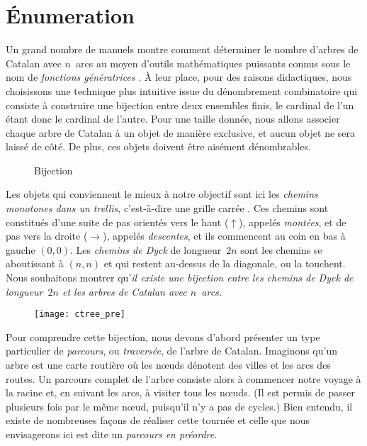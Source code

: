 \section{Énumeration}
\label{sec:Catalan_enumeration}

Un grand nombre de manuels \cite[\S~5.1
\&~5.2]{SedgewickFlajolet_1996} montre comment déterminer le nombre
d'arbres de Catalan avec \(n\)~arcs au moyen d'outils mathématiques
puissants connus sous le nom de \emph{fonctions génératrices}
\cite[chap.~7]{GrahamKnuthPatashnik_1994}. À leur place, pour des
raisons didactiques, nous choisissons une technique plus intuitive
issue du dénombrement combinatoire
qui consiste à construire une bijection entre deux ensembles finis, le
cardinal de l'un étant donc le cardinal de l'autre. Pour une taille
donnée, nous allons associer chaque arbre de Catalan à un objet de
manière exclusive, et aucun objet ne sera laissé de côté. De plus, ces
objets doivent être aisément dénombrables.

%
\begin{wrapfigure}[11]{r}[0pt]{0pt}
\centering
{}
\quad
{}
\caption{Bijection}
\label{fig:bijection}
\end{wrapfigure}
Les objets qui conviennent le mieux à notre objectif sont ici les
\emph{chemins monotones dans un trellis},  c'est-à-dire une grille carrée
\citep{Mohanty_1979,Humphreys_2010}. Ces chemins sont constitués d'une
suite de pas orientés vers le haut (\(\uparrow\)), appelés
\emph{montées}, et de pas vers la droite (\(\rightarrow\)), appelés
\emph{descentes}, et ils commencent au coin en bas à gauche
\((0,0)\). Les \emph{chemins de Dyck} de
longueur~\(2n\) sont les chemins se aboutissant à \((n,n)\) et qui
restent au-dessus de la diagonale, ou la touchent. Nous souhaitons
montrer qu'\emph{il existe une bijection entre les chemins de Dyck de
  longueur~\(2n\) et les arbres de Catalan avec \(n\)~arcs.}

\begin{wrapfigure}[7]{r}[0pt]{0pt}
\centering
\texttt{[image: ctree\_pre]}
\caption{}
\label{fig:ctree_pre}
\end{wrapfigure}
Pour comprendre cette bijection, nous devons d'abord présenter un type
particulier de \emph{parcours}, ou
\emph{traversée}, de l'arbre de
Catalan. Imaginons qu'un arbre est une carte routière où les nœuds
dénotent des villes et les arcs des routes. Un parcours complet de
l'arbre consiste alors à commencer notre voyage à la racine et, en
suivant les arcs, à visiter tous les nœuds. (Il est permis de
passer plusieurs fois par le même nœud, puisqu'il n'y a pas de
cycles.) Bien entendu, il existe de nombreuses façons de réaliser
cette tournée et celle que nous envisagerons ici est dite un
\emph{parcours en préordre}.

